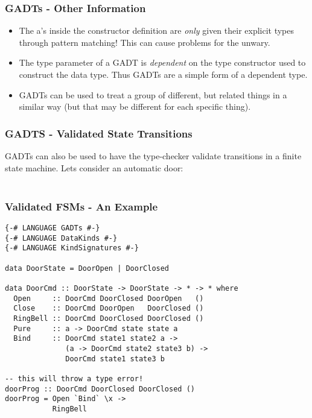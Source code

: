 \documentclass{beamer}
\begin{document}
\begin{frame}[fragile]
\frametitle{GADTs - Other Information}
  \begin{itemize}
    \item The a's inside the constructor definition are \textit{only} given
      their explicit types through pattern matching! 
      This can cause problems for the unwary.
    \item The type parameter of a GADT is \textit{dependent} on the type
      constructor used to construct the data type. Thus GADTs are a simple form
      of a dependent type.
    \item GADTs can be used to treat a group of different, but related things
      in a similar way (but that may be different for each specific thing).
  \end{itemize}
\end{frame}

\begin{frame}[fragile]
\frametitle{GADTS - Validated State Transitions}
GADTs can also be used to have the type-checker validate transitions in a 
finite state machine. Lets consider an automatic door: \\
\\
\begin{minipage}{1\textwidth}
\begin{center}
\end{center}
\end{minipage}
\end{frame}

\begin{frame}[fragile, shrink=10]
\frametitle{Validated FSMs - An Example}
\begin{verbatim}
{-# LANGUAGE GADTs #-}
{-# LANGUAGE DataKinds #-}
{-# LANGUAGE KindSignatures #-}

data DoorState = DoorOpen | DoorClosed

data DoorCmd :: DoorState -> DoorState -> * -> * where
  Open     :: DoorCmd DoorClosed DoorOpen   ()  
  Close    :: DoorCmd DoorOpen   DoorClosed ()
  RingBell :: DoorCmd DoorClosed DoorClosed ()
  Pure     :: a -> DoorCmd state state a
  Bind     :: DoorCmd state1 state2 a -> 
              (a -> DoorCmd state2 state3 b) ->
              DoorCmd state1 state3 b

-- this will throw a type error!
doorProg :: DoorCmd DoorClosed DoorClosed ()
doorProg = Open `Bind` \x ->  
           RingBell
\end{verbatim}
\end{frame}
\end{document}

